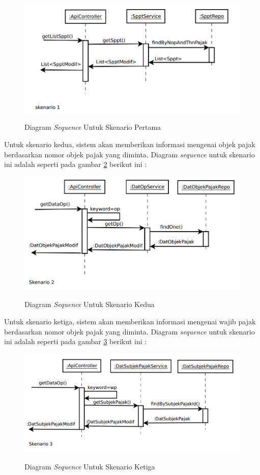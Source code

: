 \documentclass[pdftex,12pt, oneside]{article}
\begin{document}
\begin{figure}[H]
	\centering
	\includegraphics[width=1\textwidth]{./resources/seq-dia-1}
	\label{fig:seq-dia-be-1}
	\caption{Diagram \textit{Sequence} Untuk Skenario Pertama}
\end{figure}

Untuk skenario kedua, sistem akan memberikan informasi mengenai objek pajak berdasarkan nomor objek pajak yang diminta. Diagram \textit{sequence} untuk skenario ini adalah seperti pada gambar \ref{fig:seq-dia-be-2} berikut ini :

\begin{figure}[H]
	\centering
	\includegraphics[width=1\textwidth]{./resources/seq-dia-2}
	\label{fig:seq-dia-be-2}
	\caption{Diagram \textit{Sequence} Untuk Skenario Kedua}
\end{figure}

Untuk skenario ketiga, sistem akan memberikan informasi mengenai wajib pajak berdasarkan nomor objek pajak yang diminta. Diagram \textit{sequence} untuk skenario ini adalah seperti pada gambar \ref{fig:seq-dia-be-3} berikut ini :

\begin{figure}[H]
	\centering
	\includegraphics[width=1\textwidth]{./resources/seq-dia-3}
	\label{fig:seq-dia-be-3}
	\caption{Diagram \textit{Sequence} Untuk Skenario Ketiga}
\end{figure}
\end{document}
